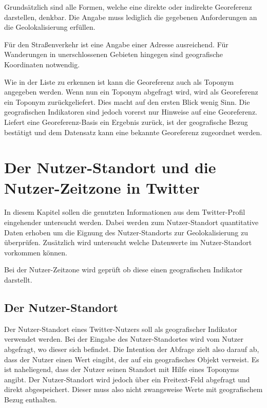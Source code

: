 	 	Grundsätzlich sind alle Formen, welche eine direkte oder indirekte Georeferenz darstellen, denkbar.
	 	Die Angabe muss lediglich die gegebenen Anforderungen an die Geolokalisierung erfüllen.

	  	Für den Straßenverkehr ist eine Angabe einer Adresse ausreichend.
		Für Wanderungen in unerschlossenen Gebieten hingegen sind geografische Koordinaten notwendig. 

		Wie in der Liste zu erkennen ist kann die Georeferenz auch als Toponym angegeben werden.
		Wenn nun ein Toponym abgefragt wird, wird als Georeferenz ein Toponym zurückgeliefert.
		Dies macht auf den ersten Blick wenig Sinn.
		Die geografischen Indikatoren sind jedoch vorerst nur Hinweise auf eine Georeferenz.
		Liefert eine Georeferenz-Basis ein Ergebnis zurück, ist der geografische Bezug bestätigt und dem Datensatz kann eine bekannte Georeferenz zugeordnet werden.				
	
	\section{Der Nutzer-Standort und die Nutzer-Zeitzone in Twitter}

		In diesem Kapitel sollen die genutzten Informationen aus dem Twitter-Profil eingehender untersucht werden.
		Dabei werden zum Nutzer-Standort quantitative Daten erhoben um die Eignung des Nutzer-Standorts zur Geolokalisierung zu überprüfen.
		Zusätzlich wird untersucht welche Datenwerte im Nutzer-Standort vorkommen können.

		Bei der Nutzer-Zeitzone wird geprüft ob diese einen geografischen Indikator darstellt. 

		\subsection{Der Nutzer-Standort} \label{subsec:nutzerStandort} 

			Der Nutzer-Standort eines Twitter-Nutzers soll als geografischer Indikator verwendet werden.
			Bei der Eingabe des Nutzer-Standortes wird vom Nutzer abgefragt, wo dieser sich befindet. 
			Die Intention der Abfrage zielt also darauf ab, dass der Nutzer einen Wert eingibt, der auf ein geografisches Objekt verweist. 
			Es ist naheliegend, dass der Nutzer seinen Standort mit Hilfe eines Toponyms angibt.
			Der Nutzer-Standort wird jedoch über ein Freitext-Feld abgefragt und direkt abgespeichert.
			Dieser muss also nicht zwangsweise Werte mit geografischem Bezug enthalten. 

